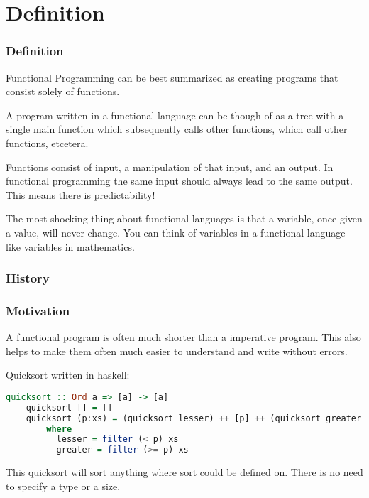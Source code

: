 \documentclass[presentation.tex]{subfiles}
\begin{document}
\section{Definition}
\begin{frame}
  \frametitle{Definition}
  Functional Programming can be best summarized as creating programs that consist solely of functions.

  \vspace{\baselineskip}
  A program written in a functional language can be though of as a tree with a single main function which subsequently calls other functions, which call other functions, etcetera.

  \vspace{\baselineskip}
  Functions consist of input, a manipulation of that input, and an output. In functional programming the same input should always lead to the same output. This means there is predictability!

  \vspace{\baselineskip}
  The most shocking thing about functional languages is that a variable, once given a value, will never change. You can think of variables in a functional language like variables in mathematics. %

\end{frame}


\begin{frame}
  \frametitle{History}
\end{frame}


\begin{frame}[fragile]
  \frametitle{Motivation}
  A functional program is often much shorter than a imperative program. This also helps to make them often much easier to understand and write without errors.

  \vspace{\baselineskip}
  Quicksort written in haskell:

  \begin{lstlisting}[language=Haskell]
    quicksort :: Ord a => [a] -> [a]
    quicksort [] = []
    quicksort (p:xs) = (quicksort lesser) ++ [p] ++ (quicksort greater)
        where
          lesser = filter (< p) xs
          greater = filter (>= p) xs
  \end{lstlisting}

  \vspace{\baselineskip}
  This quicksort will sort anything where sort could be defined on. There is no need to specify a type or a size.
\end{frame}
\end{document}
